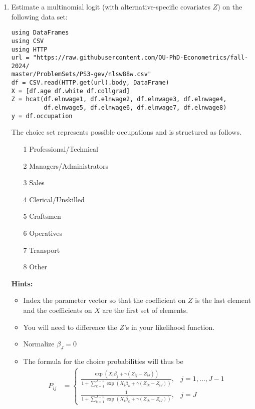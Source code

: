 \documentclass[12pt,english]{article}
\begin{document}
\begin{enumerate}
\item Estimate a multinomial logit (with alternative-specific covariates $Z$) on the following data set:

\begin{verbatim}
using DataFrames
using CSV
using HTTP
url = "https://raw.githubusercontent.com/OU-PhD-Econometrics/fall-2024/
master/ProblemSets/PS3-gev/nlsw88w.csv"
df = CSV.read(HTTP.get(url).body, DataFrame)
X = [df.age df.white df.collgrad]
Z = hcat(df.elnwage1, df.elnwage2, df.elnwage3, df.elnwage4, 
         df.elnwage5, df.elnwage6, df.elnwage7, df.elnwage8)
y = df.occupation
\end{verbatim}

The choice set represents possible occupations and is structured  as follows.

\begin{enumerate}
    \item[1] Professional/Technical 
    \item[2] Managers/Administrators
    \item[3] Sales                  
    \item[4] Clerical/Unskilled     
    \item[5] Craftsmen              
    \item[6] Operatives             
    \item[7] Transport              
    \item[8] Other                  
\end{enumerate}

\textbf{Hints:} 
\begin{itemize}
    \item Index the parameter vector so that the coefficient on $Z$ is the last element and the coefficients on $X$ are the first set of elements.
    \item You will need to difference the $Z$'s in your likelihood function. 
    \item Normalize $\beta_J = 0$
    \item The formula for the choice probabilities will thus be
    \begin{align*}
        P_{ij} &= \begin{cases} \frac{\exp\left(X_{i}\beta_j + \gamma(Z_{ij}-Z_{iJ})\right)}{1+\sum_{k=1}^{J-1}\exp\left(X_{i}\beta_k + \gamma(Z_{ik}-Z_{iJ})\right)} ,& j=1,\ldots,J-1\\
         \frac{1}{1+\sum_{k=1}^{J-1}\exp\left(X_{i}\beta_k + \gamma(Z_{ik}-Z_{iJ})\right)} ,& j=J
         \end{cases}
    \end{align*}
\end{itemize}


\end{enumerate}
\end{document}
